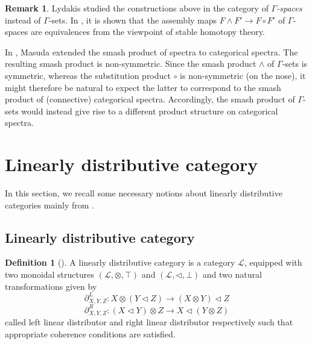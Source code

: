\documentclass{article}
\numberwithin{equation}{section}
\theoremstyle{definition}
\newtheorem{definition}[thm]{Definition}
\newtheorem{rem}[thm]{Remark}
\begin{document}
\begin{rem}Lydakis studied the constructions above in the category of {\it $\Gamma$-spaces} instead of $\Gamma$-sets.
In \cite[Proposition 5.23]{Lydakis}, it is shown that the assembly maps $F\wedge F'\to F\circ F'$ of $\Gamma$-spaces are equivalences from the viewpoint of stable homotopy theory.

In \cite{Masuda}, Masuda extended the smash product of spectra to categorical spectra. 
The resulting smash product is non-symmetric.
Since the smash product $\wedge$ of $\Gamma$-sets is symmetric, whereas the substitution product $\circ$ is non-symmetric (on the nose), it might therefore be natural to expect the latter to correspond to the smash product of (connective) categorical spectra. 
Accordingly, the smash product of $\Gamma$-sets would instead give rise to a different product structure on categorical spectra.
\end{rem}










































\section{Linearly distributive category}

In this section, we recall some necessary notions about linearly distributive categories mainly from \cite{SS}.
\subsection{Linearly distributive category}

\begin{definition}[\cite{CS, SS}]
A linearly distributive category is a category $\mathcal{L}$, equipped with two monoidal structures $(\mathcal{L}, \otimes, \top)$ and $(\mathcal{L}, \triangleleft, \bot)$ and two natural transformations given by
\[\partial_{X, Y, Z}^{L}:X\otimes(Y\triangleleft Z)\to (X\otimes Y)\triangleleft Z\]
\[\partial_{X, Y, Z}^{R}:(X\triangleleft Y)\otimes Z\to X \triangleleft (Y\otimes Z)\]
called left linear distributor and right linear distributor respectively such that appropriate coherence conditions are satisfied.
\end{definition}
\end{document}
